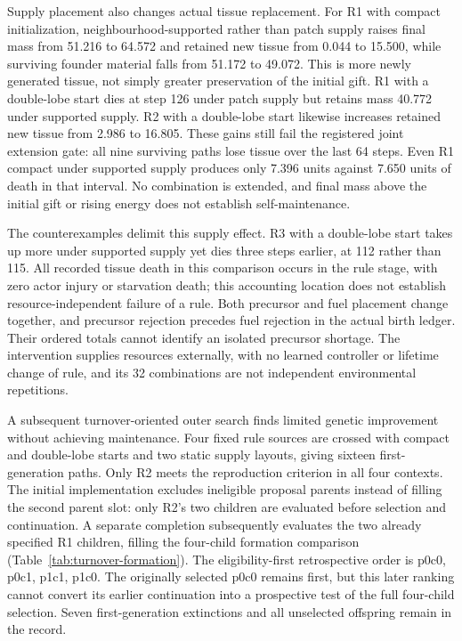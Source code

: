 Supply placement also changes actual tissue replacement. For R1 with compact initialization, neighbourhood-supported rather than patch supply raises final mass from 51.216 to 64.572 and retained new tissue from 0.044 to 15.500, while surviving founder material falls from 51.172 to 49.072. This is more newly generated tissue, not simply greater preservation of the initial gift. R1 with a double-lobe start dies at step 126 under patch supply but retains mass 40.772 under supported supply. R2 with a double-lobe start likewise increases retained new tissue from 2.986 to 16.805. These gains still fail the registered joint extension gate: all nine surviving paths lose tissue over the last 64 steps. Even R1 compact under supported supply produces only 7.396 units against 7.650 units of death in that interval. No combination is extended, and final mass above the initial gift or rising energy does not establish self-maintenance.

The counterexamples delimit this supply effect. R3 with a double-lobe start takes up more under supported supply yet dies three steps earlier, at 112 rather than 115. All recorded tissue death in this comparison occurs in the rule stage, with zero actor injury or starvation death; this accounting location does not establish resource-independent failure of a rule. Both precursor and fuel placement change together, and precursor rejection precedes fuel rejection in the actual birth ledger. Their ordered totals cannot identify an isolated precursor shortage. The intervention supplies resources externally, with no learned controller or lifetime change of rule, and its 32 combinations are not independent environmental repetitions.

A subsequent turnover-oriented outer search finds limited genetic improvement without achieving maintenance. Four fixed rule sources are crossed with compact and double-lobe starts and two static supply layouts, giving sixteen first-generation paths. Only R2 meets the reproduction criterion in all four contexts. The initial implementation excludes ineligible proposal parents instead of filling the second parent slot: only R2's two children are evaluated before selection and continuation. A separate completion subsequently evaluates the two already specified R1 children, filling the four-child formation comparison (Table~\ref{tab:turnover-formation}). The eligibility-first retrospective order is p0c0, p0c1, p1c1, p1c0. The originally selected p0c0 remains first, but this later ranking cannot convert its earlier continuation into a prospective test of the full four-child selection. Seven first-generation extinctions and all unselected offspring remain in the record.


